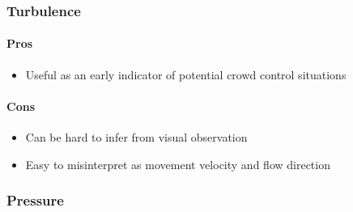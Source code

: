 \subsubsection{Turbulence}


\paragraph{Pros}
\begin{itemize}
    \item Useful as an early indicator of potential crowd control situations
\end{itemize}

\paragraph{Cons}
\begin{itemize}
    \item Can be hard to infer from visual observation
    \item Easy to misinterpret as movement velocity and flow direction
\end{itemize}

\subsubsection{Pressure}

